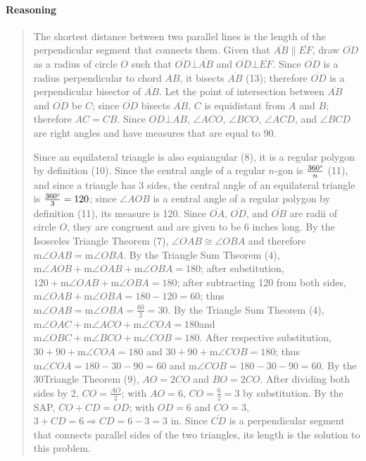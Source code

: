 \documentclass[letterpaper,12pt,twoside]{report}
\begin{document}
	\paragraph{Reasoning}
	\begin{quotation}
	
	The shortest distance between two parallel lines is the length of the perpendicular segment that connects them. Given that $\overline{AB} \parallel \overline{EF}$, draw $\overline{OD}$ as a radius of circle $O$ such that $\overline{OD}\bot\overline{AB}$ and $\overline{OD}\bot\overline{EF}$. Since $\overline{OD}$ is a radius perpendicular to chord $AB$, it bisects $\overline{AB}$ (13); therefore $\overline{OD}$ is a perpendicular bisector of $\overline{AB}$. Let the point of intersection between $\overline{AB}$ and $\overline{OD}$ be $C$; since $\overline{OD}$ bisects $\overline{AB}$, $C$ is equidistant from $A$ and $B$; therefore $AC=CB$. Since $\overline{OD}\bot\overline{AB}$, $\angle ACO$, $\angle BCO$, $\angle ACD$, and $\angle BCD$ are right angles and have measures that are equal to 90\textdegree.
	
	Since an equilateral triangle is also equiangular (8), it is a regular polygon by definition (10). Since the central angle of a regular $n$-gon is $\frac{360\text{\textdegree}}{n}$ (11), and since a triangle has 3 sides, the central angle of an equilateral triangle is $\frac{360\text{\textdegree}}{3}=120$\textdegree; since $\angle AOB$ is a central angle of a regular polygon by definition (11), its measure is 120\textdegree. Since $\overline{OA}$, $\overline{OD}$, and $\overline{OB}$ are radii of circle $O$, they are congruent and are given to be 6 inches long. By the Isosceles Triangle Theorem (7), $\angle OAB\cong\angle OBA$ and therefore $\text{m}\angle OAB=\text{m}\angle OBA$. By the Triangle Sum Theorem (4), $\text{m}\angle AOB+\text{m}\angle OAB+\text{m}\angle OBA=180$\textdegree; after substitution, $120+\text{m}\angle OAB+\text{m}\angle OBA=180$; after subtracting 120 from both sides, $\text{m}\angle OAB+\text{m}\angle OBA=180-120=60$; thus $\text{m}\angle OAB=\text{m}\angle OBA=\frac{60}{2}=30$. By the Triangle Sum Theorem (4), $\text{m}\angle OAC+\text{m}\angle ACO+\text{m}\angle COA=180$\textdegree \space and $\text{m}\angle OBC+\text{m}\angle BCO+\text{m}\angle COB=180$\textdegree. After respective substitution, $30+90+\text{m}\angle COA=180$ and $30+90+\text{m}\angle COB=180$; thus $\text{m}\angle COA=180-30-90=60$ and $\text{m}\angle COB=180-30-90=60$. By the 30\textdegree \space Triangle Theorem (9), $AO=2CO$ and $BO=2CO$. After dividing both sides by 2, $CO=\frac{AO}{2}$; with $AO=6$, $CO=\frac{6}{2}=3$ by substitution. By the SAP, $CO+CD=OD$; with $OD=6$ and $CO=3$, $3+CD=6 \Rightarrow CD=6-3=\boxed{3 \text{  in}}$. Since $\overline{CD}$ is a perpendicular segment that connects parallel sides of the two triangles, its length is the solution to this problem.
	\end{quotation}
\end{document}
